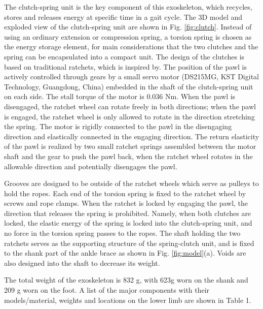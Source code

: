 \documentclass[twocolumn,cleanfoot,10pt]{asme2ej}
\begin{document}
The clutch-spring unit is the key component of this exoskeleton, which recycles, stores and releases energy at specific time in a gait cycle.
The 3D model and exploded view of the clutch-spring unit are shown in Fig. \ref{fig:clutch}.
Instead of using an ordinary extension or compression spring, a torsion spring is chosen as the energy storage element, for main considerations that the two clutches and the spring can be encapsulated into a compact unit.
The design of the clutches is based on traditional ratchets, which is inspired by\cite{RN19}.
The position of the pawl is actively controlled through gears by a small servo motor (DS215MG, KST Digital Technology, Guangdong, China) embedded in the shaft of the clutch-spring unit on each side.
The stall torque of the motor is 0.036 Nm.
When the pawl is disengaged, the ratchet wheel can rotate freely in both directions; when the pawl is engaged, the ratchet wheel is only allowed to rotate in the direction stretching the spring.
The motor is rigidly connected to the pawl in the disengaging direction and elastically connected in the engaging direction.
The return elasticity of the pawl is realized by two small ratchet springs assembled between the motor shaft and the gear to push the pawl back, when the ratchet wheel rotates in the allowable direction and potentially disengages the pawl.

Grooves are designed to be outside of the ratchet wheels which serve as pulleys to hold the ropes.
Each end of the torsion spring is fixed to the ratchet wheel by screws and rope clamps.
When the ratchet is locked by engaging the pawl, the direction that releases the spring is prohibited. 
Namely, when both clutches are locked, the elastic energy of the spring is locked into the clutch-spring unit, and no force in the torsion spring passes to the ropes.
The shaft holding the two ratchets serves as the supporting structure of the spring-clutch unit, and is fixed to the shank part of the ankle brace as shown in Fig. \ref{fig:model}(a).
Voids are also designed into the shaft to decrease its weight.

The total weight of the exoskeleton is 832 g, with 623g worn on the shank and 209 g worn on the foot.
A list of the major components with their models/material, weights and locations on the lower limb are shown in Table 1.

\end{document}
